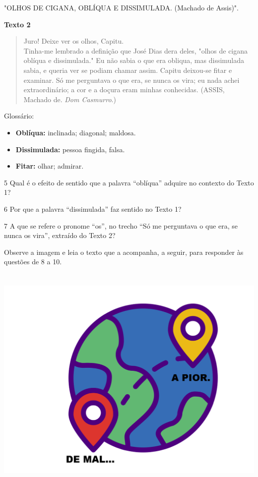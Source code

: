 "OLHOS DE CIGANA, OBLÍQUA E DISSIMULADA. (Machado de Assis)".

\textbf{Texto 2}

\begin{quote}
Juro! Deixe ver os olhos, Capitu.\\
Tinha-me lembrado a definição que José Dias dera deles, "olhos de cigana
oblíqua e dissimulada." Eu não sabia o que era obliqua, mas dissimulada
sabia, e queria ver se podiam chamar assim. Capitu deixou-se fitar e
examinar. Só me perguntava o que era, se nunca os vira; eu nada achei
extraordinário; a cor e a doçura eram minhas conhecidas. (ASSIS, Machado de. \emph{Dom Casmurro}.)
\end{quote}

Glossário:

\begin{itemize}
\item\textbf{Oblíqua:} inclinada; diagonal; maldosa.
\item\textbf{Dissimulada:} pessoa fingida, falsa.
\item\textbf{Fitar:} olhar; admirar.
\end{itemize}

\num{5} Qual é o efeito de sentido que a palavra ``oblíqua'' adquire no
contexto do Texto 1?


\num{6} Por que a palavra ``dissimulada'' faz sentido no Texto 1?


\num{7} A que se refere o pronome ``os'', no trecho ``Só me perguntava o
que era, se nunca os vira'', extraído do Texto 2?


Observe a imagem e leia o texto que a acompanha, a seguir, para
responder às questões de 8 a 10.

\includegraphics[width=5.90556in,height=4.43889in]{./imgSAEB_6_POR/media/image11.png}

